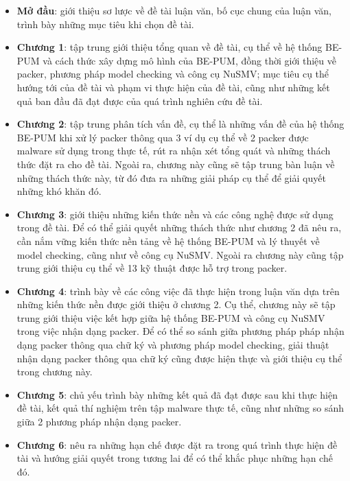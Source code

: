 \begin{itemize}
\item{\textbf{Mở đầu}: giới thiệu sơ lược về đề tài luận văn, bố cục chung của luận văn, trình bày những mục tiêu khi chọn đề tài.\\}
\item{\textbf{Chương 1}: tập trung giới thiệu tổng quan về đề tài, cụ thể về hệ thống BE-PUM và cách thức xây dựng mô hình của BE-PUM, đồng thời giới thiệu về packer, phương pháp model checking và công cụ NuSMV; mục tiêu cụ thể hướng tới của đề tài và phạm vi thực hiện của đề tài, cũng như những kết quả ban đầu đã đạt được của quá trình nghiên cứu đề tài.\\}
\item{\textbf{Chương 2}: tập trung phân tích vấn đề, cụ thể là những vấn đề của hệ thống BE-PUM khi xử lý packer thông qua 3 ví dụ cụ thể về 2 packer được malware sử dụng trong thực tế, rút ra nhận xét tổng quát và những thách thức đặt ra cho đề tài. Ngoài ra, chương này cũng sẽ tập trung bàn luận về những thách thức này, từ đó đưa ra những giải pháp cụ thể để giải quyết những khó khăn đó.\\}
\item{\textbf{Chương 3}: giới thiệu những kiến thức nền và các công nghệ được sử dụng trong đề tài. Để có thể giải quyết những thách thức như chương 2 đã nêu ra, cần nắm vững kiến thức nền tảng về hệ thống BE-PUM và lý thuyết về model checking, cũng như về công cụ NuSMV. Ngoài ra chương này cũng tập trung giới thiệu cụ thể về 13 kỹ thuật được hỗ trợ trong packer.\\}
\item{\textbf{Chương 4}: trình bày về các công việc đã thực hiện trong luận văn dựa trên những kiến thức nền được giới thiệu ở chương 2. Cụ thể, chương này sẽ tập trung giới thiệu việc kết hợp giữa hệ thống BE-PUM và công cụ NuSMV trong việc nhận dạng packer. Để có thể so sánh giữa phương pháp pháp nhận dạng packer thông qua chữ ký và phương pháp model checking, giải thuật nhận dạng packer thông qua chữ ký cũng được hiện thực và giới thiệu cụ thể trong chương này.\\}
\item{\textbf{Chương 5}: chủ yếu trình bày những kết quả đã đạt được sau khi thực hiện đề tài, kết quả thí nghiệm trên tập malware thực tế, cũng như những so sánh giữa 2 phương pháp nhận dạng packer.\\}
\item{\textbf{Chương 6}: nêu ra những hạn chế được đặt ra trong quá trình thực hiện đề tài và hướng giải quyết trong tương lai để có thể khắc phục những hạn chế đó.}
\end{itemize}

